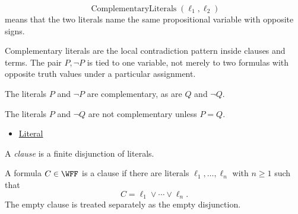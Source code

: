\begin{remark*}
\[
\operatorname{ComplementaryLiterals}(\ell_1,\ell_2)
\]
means that the two literals name the same propositional variable with opposite
signs.
\end{remark*}

\begin{remark*}[Interpretation]
Complementary literals are the local contradiction pattern inside clauses and
terms. The pair \(P,\neg P\) is tied to one variable, not merely to two formulas
with opposite truth values under a particular assignment.
\end{remark*}

\begin{remark*}[Examples]
The literals \(P\) and \(\neg P\) are complementary, as are \(Q\) and
\(\neg Q\).
\end{remark*}

\begin{remark*}
The literals \(P\) and \(\neg Q\) are not complementary unless \(P=Q\).
\end{remark*}

\begin{dependencies}
\begin{itemize}
  \item \hyperref[def:literal-propositional-logic]{Literal}
\end{itemize}
\end{dependencies}

\begin{tcolorbox}[colback=propbox, colframe=propborder, arc=2pt,
  left=6pt, right=6pt, top=4pt, bottom=4pt,
  title={\small\textbf{Definition (Clause)}},
  fonttitle=\small\bfseries]
\begin{definition}[Clause]
\label{def:clause-propositional-logic}
A \emph{clause} is a finite disjunction of literals.
\end{definition}
\end{tcolorbox}

\begin{remark*}
A formula \(C\in\WFF\) is a clause if there are literals
\(\ell_1,\ldots,\ell_n\) with \(n\ge 1\) such that
\[
C=\ell_1\lor\cdots\lor\ell_n.
\]
The empty clause is treated separately as the empty disjunction.
\end{remark*}

